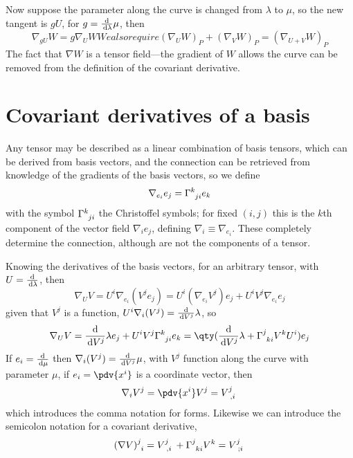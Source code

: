 Now suppose the parameter along the curve is changed from $\lambda$ to
$\mu$, so the new tangent is $gU$, for $g = \frac{\mathrm{d}}{\,\mathrm{d} \lambda}{\mu}$, then
\begin{subequations}
\begin{equation}
  \label{eq:46}
  \nabla_{gU} W = g \nabla_U W
\end{equation}
We also require
\begin{equation}
  \label{eq:47}
(\nabla_U W)_P +(\nabla_V W)_P = (\nabla_{U+V} W)_P
\end{equation}
\end{subequations}
The fact that $\nabla W$ is a tensor field---the gradient of $W$
allows the curve can be removed from the definition of the covariant
derivative.

\section{Covariant derivatives of a basis}
\label{sec:covar-deriv-basis}

Any tensor may be described as a linear combination of basis tensors,
which can be derived from basis vectors, and the connection can be
retrieved from knowledge of the gradients of the basis vectors, so we
define
\begin{equation}
  \label{eq:48}
  \nabla_{e_i} e_j = \tensor{\Gamma}{^k_{ji}} e_k
\end{equation}
with the symbol $\tensor{\Gamma}{^k_{ji}}$ the Christoffel symbols;
for fixed $(i,j)$ this is the $k$th component of the vector field
$\nabla_i e_j$, defining $\nabla_i \equiv \nabla_{e_i}$. These
completely determine the connection, although are not the components
of a tensor.

Knowing the derivatives of the basis vectors, for an arbitrary tensor, with $U=\frac{\mathrm{d}}{\,\mathrm{d} \lambda}$, then
\begin{equation}
  \label{eq:49}
  \nabla_U V = U^i \nabla_{e_i}(V^j e_j) = U^i( \nabla_{e_i} V^j )e_j + U^i V^j \nabla_{e_i} e_j
\end{equation}
given that $V^j$ is a function, $U^i \nabla_i (V^j) =
\frac{\mathrm{d}}{\,\mathrm{d} V^j}{\lambda}$, so
\begin{equation}
  \label{eq:50}
  \nabla_U V = \dv{V^j}{\lambda} e_j + U^i V^j \tensor{\Gamma}{^k_{ji}}e_k = \qty( \dv{V^j}{\lambda} + \tensor{\Gamma}{^j_{ki}} V^k U^i ) e_j
\end{equation}
If $e_i = \frac{\mathrm{d}}{\,\mathrm{d} \mu}$ then $\nabla_i (V^j) = \frac{\mathrm{d}}{\,\mathrm{d} V^j}{\mu}$, with $V^j$
function along the curve with parameter $\mu$, if $e_i = \pdv{x^i}$ is
a coordinate vector, then
\begin{equation}
  \label{eq:51}
  \nabla_i V^j = \pdv{x^i} V^j = \tensor{V}{^j_{,i}}
\end{equation}
which introduces the comma notation for forms. Likewise we can
introduce the semicolon notation for a covariant derivative,
\begin{equation}
  \label{eq:52}
  \tensor{(\nabla V)}{^j_i} = \tensor{V}{^j_{,i}} + \tensor{\Gamma}{^j_{ki}} V^k = \tensor{V}{^j_{;i}}
\end{equation}

